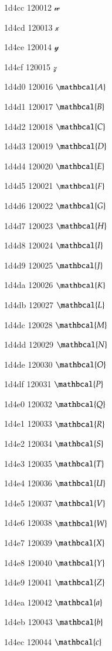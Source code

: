 \documentclass[11pt]{article}
\begin{document}
1d4cc 120012 \ensuremath{\mathscr{w}}

1d4cd 120013 \ensuremath{\mathscr{x}}

1d4ce 120014 \ensuremath{\mathscr{y}}

1d4cf 120015 \ensuremath{\mathscr{z}}

1d4d0 120016 \ensuremath{\mathbcal{A}}

1d4d1 120017 \ensuremath{\mathbcal{B}}

1d4d2 120018 \ensuremath{\mathbcal{C}}

1d4d3 120019 \ensuremath{\mathbcal{D}}

1d4d4 120020 \ensuremath{\mathbcal{E}}

1d4d5 120021 \ensuremath{\mathbcal{F}}

1d4d6 120022 \ensuremath{\mathbcal{G}}

1d4d7 120023 \ensuremath{\mathbcal{H}}

1d4d8 120024 \ensuremath{\mathbcal{I}}

1d4d9 120025 \ensuremath{\mathbcal{J}}

1d4da 120026 \ensuremath{\mathbcal{K}}

1d4db 120027 \ensuremath{\mathbcal{L}}

1d4dc 120028 \ensuremath{\mathbcal{M}}

1d4dd 120029 \ensuremath{\mathbcal{N}}

1d4de 120030 \ensuremath{\mathbcal{O}}

1d4df 120031 \ensuremath{\mathbcal{P}}

1d4e0 120032 \ensuremath{\mathbcal{Q}}

1d4e1 120033 \ensuremath{\mathbcal{R}}

1d4e2 120034 \ensuremath{\mathbcal{S}}

1d4e3 120035 \ensuremath{\mathbcal{T}}

1d4e4 120036 \ensuremath{\mathbcal{U}}

1d4e5 120037 \ensuremath{\mathbcal{V}}

1d4e6 120038 \ensuremath{\mathbcal{W}}

1d4e7 120039 \ensuremath{\mathbcal{X}}

1d4e8 120040 \ensuremath{\mathbcal{Y}}

1d4e9 120041 \ensuremath{\mathbcal{Z}}

1d4ea 120042 \ensuremath{\mathbcal{a}}

1d4eb 120043 \ensuremath{\mathbcal{b}}

1d4ec 120044 \ensuremath{\mathbcal{c}}
\end{document}
